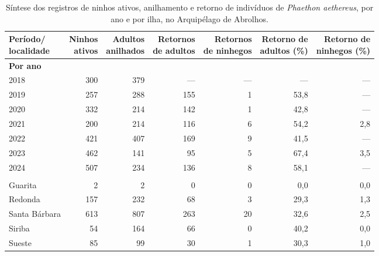 \documentclass[11pt]{article}
\begin{document}
\begin{table}[htbp]
\centering
\caption{Síntese dos registros de ninhos ativos, anilhamento e retorno de indivíduos de \textit{Phaethon aethereus}, por ano e por ilha, no Arquipélago de Abrolhos.}
\label{tab:monitoramento}
\small
\begin{tabular}{lrrrrrr}
\toprule
\shortstack{Período/\\localidade} &
\shortstack{Ninhos\\ativos} &
\shortstack{Adultos\\anilhados} &
\shortstack{Retornos\\de adultos} &
\shortstack{Retornos\\de ninhegos} &
\shortstack{Retorno de\\adultos (\%)} &
\shortstack{Retorno de\\ninhegos (\%)} \\
\midrule
\multicolumn{7}{l}{\textbf{Por ano}} \\
2018 & 300 & 379 & --- & --- & ---  & --- \\
2019 & 257 & 288 & 155 & 1 & 53,8 & --- \\
2020 & 332 & 214 & 142 & 1 & 42,8 & --- \\
2021 & 200 & 214 & 116 & 6 & 54,2 & 2,8 \\
2022 & 421 & 407 & 169 & 9 & 41,5 & --- \\
2023 & 462 & 141 & 95  & 5 & 67,4 & 3,5 \\
2024 & 507 & 234 & 136 & 8 & 58,1 & --- \\
\addlinespace
\multicolumn{7}{l}{\textbf{Por ilha}} \\
Guarita        & 2   & 2   & 0   & 0  & 0,0  & 0,0 \\
Redonda        & 157 & 232 & 68  & 3  & 29,3 & 1,3 \\
Santa Bárbara  & 613 & 807 & 263 & 20 & 32,6 & 2,5 \\
Siriba         & 54  & 164 & 66  & 0  & 40,2 & 0,0 \\
Sueste         & 85  & 99  & 30  & 1  & 30,3 & 1,0 \\
\bottomrule
\end{tabular}
\end{table}
\end{document}
